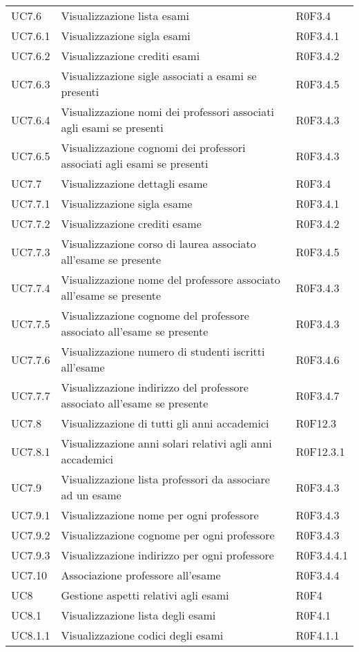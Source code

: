 \documentclass[AnalisiDeiRequisiti.tex]{subfiles}
\begin{document}
\begin{longtable}[H]{p{2cm}p{5cm}p{5cm}}
	UC7.6 & Visualizzazione lista esami & R0F3.4 \\
	UC7.6.1 & Visualizzazione sigla esami & R0F3.4.1 \\
	UC7.6.2 & Visualizzazione crediti esami & R0F3.4.2 \\
	UC7.6.3 & Visualizzazione sigle \citGloss{corsi di laurea} associati a esami se presenti & R0F3.4.5 \\
	UC7.6.4 & Visualizzazione nomi dei professori associati agli esami se presenti & R0F3.4.3 \\
	UC7.6.5 & Visualizzazione cognomi dei professori associati agli esami se presenti & R0F3.4.3 \\
	UC7.7 & Visualizzazione dettagli esame & R0F3.4 \\
	UC7.7.1 & Visualizzazione sigla esame & R0F3.4.1 \\
	UC7.7.2 & Visualizzazione crediti esame & R0F3.4.2 \\
	UC7.7.3 & Visualizzazione corso di laurea associato all'esame se presente & R0F3.4.5 \\
	UC7.7.4 & Visualizzazione nome del professore associato all'esame se presente & R0F3.4.3 \\
	UC7.7.5 & Visualizzazione cognome del professore associato all'esame se presente & R0F3.4.3 \\
	UC7.7.6 & Visualizzazione numero di studenti iscritti all'esame & R0F3.4.6 \\
	UC7.7.7 & Visualizzazione indirizzo del professore associato all'esame se presente & R0F3.4.7 \\
	UC7.8 & Visualizzazione di tutti gli anni accademici & R0F12.3 \\
	UC7.8.1 & Visualizzazione anni solari relativi agli anni accademici & R0F12.3.1 \\
	UC7.9 & Visualizzazione lista professori da associare ad un esame & R0F3.4.3 \\
	UC7.9.1 & Visualizzazione nome per ogni professore & R0F3.4.3 \\
	UC7.9.2 & Visualizzazione cognome per ogni professore & R0F3.4.3 \\
	UC7.9.3 & Visualizzazione indirizzo per ogni professore & R0F3.4.4.1 \\
	UC7.10 & Associazione professore all'esame & R0F3.4.4 \\
	UC8 & Gestione aspetti relativi agli esami & R0F4 \\
	UC8.1 & Visualizzazione lista degli esami & R0F4.1 \\
	UC8.1.1 & Visualizzazione codici degli esami & R0F4.1.1 \\

\end{longtable}
\end{document}
